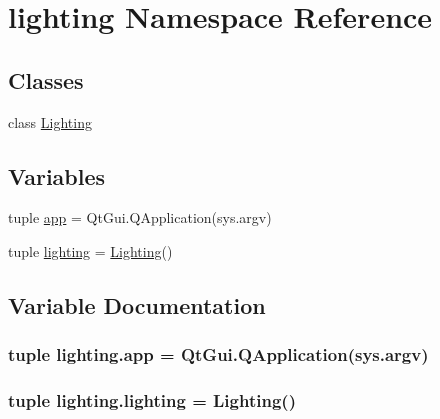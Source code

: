 \hypertarget{namespacelighting}{}\section{lighting Namespace Reference}
\label{namespacelighting}
\subsection*{Classes}
\begin{DoxyCompactItemize}
\item 
class \hyperlink{classlighting_1_1Lighting}{Lighting}
\end{DoxyCompactItemize}
\subsection*{Variables}
\begin{DoxyCompactItemize}
\item 
tuple \hyperlink{namespacelighting_a7be962a588cd3e6c355109cf72d6d244}{app} = Qt\+Gui.\+Q\+Application(sys.\+argv)
\item 
tuple \hyperlink{namespacelighting_a27c9a1f563ac587f33f668b5d976cd1a}{lighting} = \hyperlink{classlighting_1_1Lighting}{Lighting}()
\end{DoxyCompactItemize}


\subsection{Variable Documentation}
\hypertarget{namespacelighting_a7be962a588cd3e6c355109cf72d6d244}{}
\subsubsection[{app}]{\setlength{\rightskip}{0pt plus 5cm}tuple lighting.\+app = Qt\+Gui.\+Q\+Application(sys.\+argv)}\label{namespacelighting_a7be962a588cd3e6c355109cf72d6d244}
\hypertarget{namespacelighting_a27c9a1f563ac587f33f668b5d976cd1a}{}
\subsubsection[{lighting}]{\setlength{\rightskip}{0pt plus 5cm}tuple lighting.\+lighting = {\bf Lighting}()}\label{namespacelighting_a27c9a1f563ac587f33f668b5d976cd1a}
